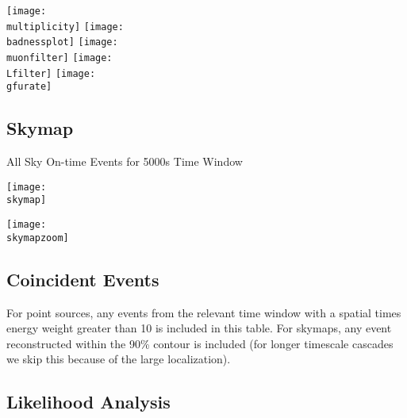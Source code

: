 \documentclass[titlepage]{article}
\begin{document}
\vspace{1em}
{
 \centering
 \texttt{[image: \\multiplicity]}
 \texttt{[image: \\badnessplot]}
 \texttt{[image: \\muonfilter]}
 \texttt{[image: \\Lfilter]}
 \texttt{[image: \\gfurate]}
}


%
%
%
%
%
%
%

\pagebreak
\subsection{Skymap}

{
  \centering
  {\Large All Sky On-time Events for 5000s Time Window}

  \texttt{[image: \\skymap]}

  \texttt{[image: \\skymapzoom]}

}
\pagebreak

\subsection{Coincident Events}
For point sources, any events from the relevant time window with a spatial times energy weight greater than 10 is included in this table. For skymaps, any event reconstructed within the 90\% contour is included (for longer timescale cascades we skip this because of the large localization).
\event

\subsection{Likelihood Analysis}
\results
\pagebreak

\backgroundpdfplot

\survivialfunctionplot
\end{document}
